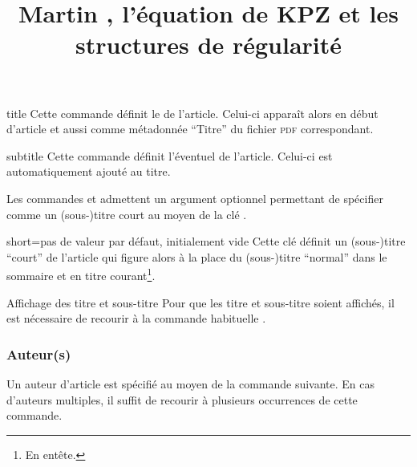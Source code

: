 \begin{docCommand}[doc description=\mandatory]{title}{}
  Cette commande définit le  de l'article. Celui-ci apparaît alors
  en début d'article et aussi comme métadonnée \enquote{Titre} du fichier
  \textsc{pdf} correspondant.
\end{docCommand}

\begin{docCommand}{subtitle}{}
  Cette commande définit l'éventuel  de l'article. Celui-ci
  est automatiquement ajouté au titre.
\end{docCommand}

Les commandes  et  admettent un argument
optionnel permettant de spécifier comme  un (sous-)titre court au
moyen de la clé .

\begin{docKey}{short}{=}{pas de valeur par défaut,
    initialement vide}
  Cette clé définit un (sous-)titre \enquote{court} de l'article qui figure
  alors à la place du (sous-)titre \enquote{normal} dans le sommaire et en titre
  courant\footnote{En entête.}.
\end{docKey}

\begin{bodycode}
\title[short=Les travaux de Martin \surname{Hairer}]{Martin ,
  l'équation de KPZ et les structures de régularité}
\end{bodycode}

\begin{dbremark}{Affichage des titre et sous-titre}{}
  Pour que les titre et sous-titre soient affichés, il est nécessaire de
  recourir à la commande habituelle .
\end{dbremark}

\subsubsection{Auteur(s)}
\label{sec-auteurs}

Un auteur d'article est spécifié au moyen de la commande 
suivante. En cas d'auteurs multiples, il  suffit de recourir à plusieurs
occurrences de cette commande.

